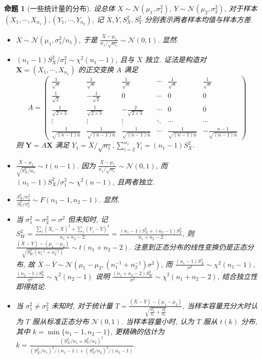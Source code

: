 \documentclass[8pt]{article}
\theoremstyle{compact}
\newtheorem{proposition}[theorem]{命题}
\begin{document}
\begin{proposition}[一些统计量的分布]
	设总体 $X \sim \mathcal N(\mu_1, \sigma_1^2)$, $Y \sim \mathcal N(\mu_2, \sigma_2^2)$, 对于样本 $(X_1, \cdots, X_{n_1}), (Y_1, \cdots, Y_{n_2})$, 记 $\overline{X}, \overline{Y}, S_X^2, S_Y^2$ 分别表示两者样本均值与样本方差.
	\begin{itemize}
		\item $\overline{X} \sim \mathcal N(\mu_1, \sigma_1^2 / n_1)$, 于是 $\frac{\overline{X} - \mu_1}{\sigma_1 / \sqrt{n_1}} \sim \mathcal N(0, 1)$. \textit{显然.}
		\item $(n_1-1)S_X^2 / \sigma_1^2 \sim \chi^2(n_1-1)$, 且与 $\overline{X}$ 独立. \textit{证法是构造对 $\mathbf X = (X_1, \cdots, X_{n_1})$ 的正交变换 $A$ 满足 $$A = \begin{pmatrix}
			\frac{1}{\sqrt n} & \frac{1}{\sqrt n} & \frac{1}{\sqrt n} & \cdots & \frac{1}{\sqrt n} & \frac{1}{\sqrt n} \\
			\frac{1}{\sqrt 2} & -\frac{1}{\sqrt 2} & 0 & \cdots & 0 & 0 \\
			\frac{1}{\sqrt{2 \times 3}} & \frac{1}{\sqrt{2 \times 3}} & -\frac{2}{\sqrt{2 \times 3}} & \cdots & 0 & 0 \\
			\vdots & \vdots & \vdots & \ddots & \cdots & \cdots \\
			\frac{1}{\sqrt{(n-1)n}} & \frac{1}{\sqrt{(n-1)n}} & \frac{1}{\sqrt{(n-1)n}} & \cdots & \frac{1}{\sqrt{(n-1)n}} & -\frac{n-1}{\sqrt{(n-1)n}} 
		\end{pmatrix}$$ 则 $\mathbf Y = A\mathbf X$ 满足 $Y_1 = \overline{X} / \sqrt{n_1}, \sum_{i=2}^{n_1}Y_i = (n_1 - 1)S_X^2$.}
		\item $\frac{\overline{X} - \mu_1}{\sqrt{S_X^2 / n_1}} \sim t(n-1)$. \textit{因为 $\frac{\overline{X} - \mu_1}{\sigma_1 / \sqrt{n_1}} \sim \mathcal N(0, 1)$, 而 $(n_1-1)S_X^2 / \sigma_1^2 \sim \chi^2(n-1)$, 且两者独立.}
		\item $\frac{S_X^2 / \sigma_1^2}{S_Y^2 / \sigma_2^2} \sim F(n_1 - 1, n_2 - 1)$. \textit{显然.}
		\item 当 $\sigma_1^2 = \sigma_2^2 = \sigma^2$ 但未知时, 记 $S_W^2 = \frac{\sum_i (X_i - \overline{X})^2 + \sum_j (Y_j - \overline{Y})^2}{n_1 + n_2 - 2} = \frac{(n_1 - 1)S_X^2 + (n_2 - 1)S_Y^2}{n_1 + n_2 - 2}$, 则 $\frac{(\overline{X} - \overline{Y}) - (\mu_1 - \mu_2)}{\sqrt{S_W^2(n_1^{-1} + n_2^{-1})}} \sim t(n_1 + n_2 - 2)$. \textit{注意到正态分布的线性变换仍是正态分布, 故 $\overline{X} - \overline{Y} \sim \mathcal N(\mu_1 - \mu_2, (n_1^{-1} + n_2^{-1})\sigma^2)$, 而 $\frac{(n_1 - 1)S_X^2}{\sigma^2} \sim \chi^2(n_1 - 1)$, $\frac{(n_2 - 1)S_Y^2}{\sigma^2} \sim \chi^2(n_2 - 1)$ 说明 $\frac{(n_1 + n_2 - 2)S_W^2}{\sigma^2} \sim \chi^2(n_1 + n_2 - 2)$, 结合独立性即得结论.}
		\item 当 $\sigma_1^2 \neq \sigma_2^2$ 未知时, 对于统计量 $T = \frac{(\overline{X} - \overline{Y}) - (\mu_1 - \mu_2)}{\sqrt{\frac{S_X^2}{n_1} + \frac{S_Y^2}{n_2}}}$, 当样本容量充分大时认为 $T$ 服从标准正态分布 $\mathcal N(0, 1)$. 当样本容量小时, 认为 $T$ 服从 $t(k)$ 分布, 其中 $k = \min\{n_1 - 1, n_2 - 1\}$, 更精确的估计为 $k = \frac{(S_X^2/n_1 + S_Y^2 / n_2)^2}{(S_X^2/n_1)^2/(n_1-1) + (S_Y^2/n_2)^2/(n_2-1)}$.
	\end{itemize}
\end{proposition}
\end{document}
